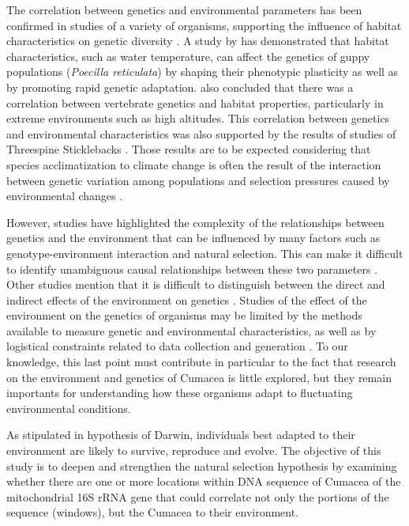 The correlation between genetics and environmental parameters has been confirmed in studies of a variety of organisms, supporting the influence of habitat characteristics on genetic diversity \citep{colosimo_widespread_2005, cheviron_genomic_2012}. A study by \cite{ghalambor_adaptive_2007} has demonstrated that habitat characteristics, such as water temperature, can affect the genetics of guppy populations (\emph{Poecilla reticulata}) by shaping their phenotypic plasticity as well as by promoting rapid genetic adaptation. \cite{cheviron_genomic_2012} also concluded that there was a correlation between vertebrate genetics and habitat properties, particularly in extreme environments such as high altitudes. This correlation between genetics and environmental characteristics was also supported by the results of studies of Threespine Sticklebacks \citep{colosimo_widespread_2005}. Those results are to be expected considering that species acclimatization to climate change is often the result of the interaction between genetic variation among populations and selection pressures caused by environmental changes \citep{hoffmann_climate_2011}.

However, studies have highlighted the complexity of the relationships between genetics and the environment that can be influenced by many factors such as genotype-environment interaction and natural selection. This can make it difficult to identify unambiguous causal relationships between these two parameters \citep{balkenhol_identifying_2009}. Other studies mention that it is difficult to distinguish between the direct and indirect effects of the environment on genetics \citep{manel_perspectives_2010, balkenhol_landscape_2019}. Studies of the effect of the environment on the genetics of organisms may be limited by the methods available to measure genetic and environmental characteristics, as well as by logistical constraints related to data collection and generation \citep{manel_perspectives_2010, shafer_widespread_2013}. To our knowledge, this last point must contribute in particular to the fact that research on the environment and genetics of Cumacea is little explored, but they remain importants for understanding how these organisms adapt to fluctuating environmental conditions. 

As stipulated in hypothesis of Darwin, individuals best adapted to their environment are likely to survive, reproduce and evolve. The objective of this study is to deepen and strengthen the natural selection hypothesis by examining whether there are one or more locations within DNA sequence of Cumacea of the mitochondrial 16S rRNA gene that could correlate not only the portions of the sequence (windows), but the Cumacea to their environment.

